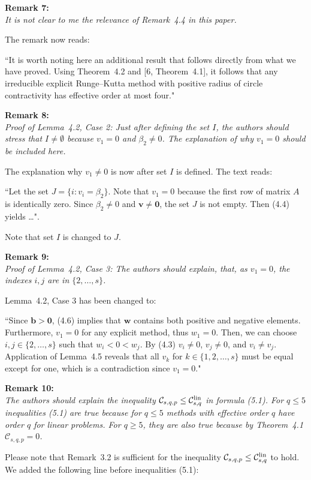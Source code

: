 \documentclass[12pt]{article}
\newcommand{\remark}[2]{\vspace{25pt} \noindent \textbf{Remark #1:\newline} \textit{#2}\vspace{15pt}}
\renewcommand{\newline}{\vspace{15pt}\\}
\newcommand{\sspcoef}{\mathcal{C}}
\newcommand{\clin}{\sspcoef^{\textnormal{lin}}_{s,q}}
\begin{document}
\remark{7}{
It is not clear to me the relevance of Remark~4.4 in this paper.}

The remark now reads:

``It is worth noting here an additional result that 
follows directly from what we have proved.
Using Theorem~4.2 and [6, Theorem~4.1], 
it follows that any irreducible explicit Runge--Kutta method with positive radius of
circle contractivity has effective order at most four."

\remark{8}{
Proof of Lemma~4.2, Case 2: Just after defining the set $I$, the authors should stress that
$I \neq \emptyset$ because $v_1 = 0$ and $\beta_2 \neq 0$.
The explanation of why $v_1 = 0$ should be included
here.}

The explanation why $v_1 \neq 0$ is now after set $I$ is defined. The text reads:

``Let the set $J = \{i : v_i = \beta_2\}$. 
Note that $v_1 = 0$ because the first row of matrix $A$ is identically zero.
Since $\beta_2 \neq 0$ and $ \bm{v} \neq \bm{0}$, the set $J$ is not empty.
Then (4.4) yields \dots".

Note that set $I$ is changed to $J$.
	
\remark{9}{
Proof of Lemma~4.2, Case 3: The authors should explain, that, as $v_1 = 0$, the 
indexes $i,j$ are in $\{2,\dots,s\}$.}

Lemma~4.2, Case 3 has been changed to:

``Since $\bm{b} > \bm{0}$, (4.6) implies that $\bm{w}$ contains both positive 
and negative elements. 
Furthermore, $v_1=0$ for any explicit method, thus $w_1=0$.
Then, we can choose $i, j \in \{2, \dots, s\}$ such that $w_i < 0 < w_j$.
By (4.3) $v_i\ne 0$, $v_j\ne 0$, and $v_i\ne v_j$.
Application of Lemma~4.5 reveals that all $v_k$ for 
$k \in\{1,2,\dots,s\}$ must be equal except for one, which is a contradiction
since $v_1 = 0$."

\remark{10}{
The authors should explain the inequality $\sspcoef_{s,q,p} \leq \clin$ in formula (5.1). 
For $q \leq 5$ inequalities (5.1) are true because for $q \leq 5$ methods with effective 
order $q$ have order $q$ for linear problems. 
For $q \geq 5$, they are also true because by Theorem~4.1 $\sspcoef_{s,q,p}  = 0$.}

Please note that Remark~3.2 is sufficient for the inequality 
$\sspcoef_{s,q,p} \leq \clin$ to hold.
We added the following line before inequalities (5.1):
\end{document}
